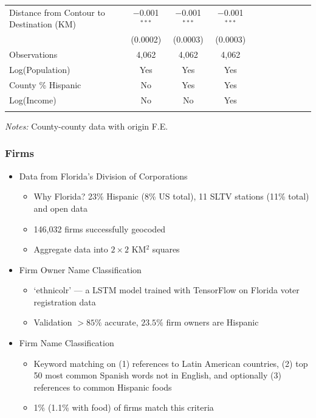 \documentclass{beamer}
\begin{document}
\begin{frame}
\begin{center}
{\begin{threeparttable}
\begin{tabular}{lcccccccccc}
 Distance from Contour to Destination (KM) & $-$0.001$^{***}$ & $-$0.001$^{***}$ & $-$0.001$^{***}$ \\ 
  & (0.0002) & (0.0003) & (0.0003) \\ 
Observations & 4,062 & 4,062 & 4,062 \\         
\hline\addlinespace
                                Log(Population) & Yes & Yes  & Yes\\
                                County \% Hispanic & No & Yes & Yes\\
                                Log(Income) & No & No & Yes\\
				\addlinespace\hline\hline
			\end{tabular}
			\begin{tablenotes}[flushleft]
				\item \textit{Notes:} County-county data with origin F.E. 
			\end{tablenotes}
		\end{threeparttable}

        }
\end{center}
\end{frame}

\begin{frame}
\frametitle{Firms}

\begin{itemize}
\item Data from Florida's Division of Corporations
\begin{itemize}
\item Why Florida? 23\% Hispanic (8\% US total), 11 SLTV stations (11\% total) and open data
\item 146,032 firms successfully geocoded
\item Aggregate data into $2\times 2$ KM$^2$ squares
\end{itemize}
\item Firm Owner Name Classification
\begin{itemize}
\item `ethnicolr' --- a LSTM model trained with TensorFlow on Florida voter registration data
\item Validation $>85\%$ accurate, $23.5\%$ firm owners are Hispanic
\end{itemize}
\item Firm Name Classification
\begin{itemize}
\item Keyword matching on (1) references to Latin American countries, (2) top 50 most common Spanish words not in English, and optionally (3) references to common Hispanic foods
\item 1\% (1.1\% with food) of firms match this criteria
\end{itemize}
\end{itemize}
\end{frame}
\end{document}
